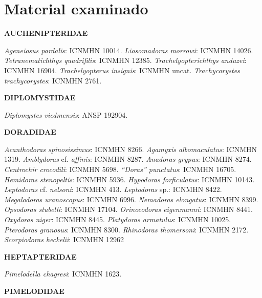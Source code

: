 \chapter{Material examinado}
\label{app:appMaterialExamined}

\textbf{AUCHENIPTERIDAE}

\textit{Ageneiosus pardalis}: ICNMHN 10014. \textit{Liosomadoras morrowi}: ICNMHN 14026. \textit{Tetranematichthys quadrifilis}: ICNMHN 12385. \textit{Trachelyopterichthys anduzei}: ICNMHN 16904. \textit{Trachelyopterus insignis}: ICNMHN uncat. \textit{Trachycorystes trachycorystes}: ICNMHN 2761.

\textbf{DIPLOMYSTIDAE}

\textit{Diplomystes viedmensis}: ANSP 192904.

\textbf{DORADIDAE}

\textit{Acanthodoras spinosissimus}: ICNMHN 8266. \textit{Agamyxis albomaculatus}: ICNMHN 1319. \textit{Amblydoras} cf. \textit{affinis}: ICNMHN 8287. \textit{Anadoras grypus}: ICNMHN 8274. \textit{Centrochir crocodili}: ICNMHN 5698. \textit{``Doras'' punctatus}: ICNMHN 16705. \textit{Hemidoras stenopeltis}: ICNMHN 5936. \textit{Hypodoras forficulatus}: ICNMHN 10143. \textit{Leptodoras} cf. \textit{nelsoni}: ICNMHN 413. \textit{Leptodoras} sp.: ICNMHN 8422. \textit{Megalodoras uranoscopus}: ICNMHN 6996. \textit{Nemadoras elongatus}: ICNMHN 8399. \textit{Opsodoras stubelli}: ICNMHN 17104. \textit{Orinocodoras eigenmanni}: ICNMHN 8441. \textit{Oxydoras niger}: ICNMHN 8445. \textit{Platydoras armatulus}: ICNMHN 10025. \textit{Pterodoras granosus}: ICNMHN 8300. \textit{Rhinodoras thomersoni}: ICNMHN 2172. \textit{Scorpiodoras heckelii}: ICNMHN 12962

\textbf{HEPTAPTERIDAE}

\textit{Pimelodella chagresi}: ICNMHN 1623.

\textbf{PIMELODIDAE}


